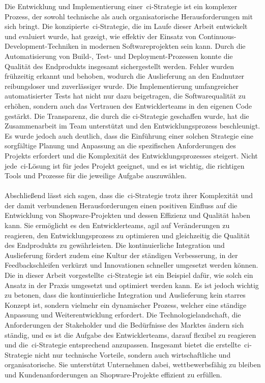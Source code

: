 Die Entwicklung und Implementierung einer\ \acrshort{ci}-Strategie ist ein komplexer Prozess, der sowohl technische als
auch organisatorische Herausforderungen mit sich bringt.
Die konzipierte\ \acrshort{ci}-Strategie, die im Laufe dieser Arbeit entwickelt und evaluiert wurde, hat gezeigt, wie
effektiv der Einsatz von Continuous-Development-Techniken in modernen Softwareprojekten sein kann.
Durch die Automatisierung von Build-, Test- und Deployment-Prozessen konnte die Qualität des Endprodukts insgesamt
sichergestellt werden.
Fehler wurden frühzeitig erkannt und behoben, wodurch die Auslieferung an den Endnutzer reibungsloser und zuverlässiger
wurde.
Die Implementierung umfangreicher automatisierter Tests hat nicht nur dazu beigetragen, die Softwarequalität zu erhöhen,
sondern auch das Vertrauen des Entwicklerteams in den eigenen Code gestärkt.
Die Transparenz, die durch die \acrshort{ci}-Strategie geschaffen wurde, hat die Zusammenarbeit im Team unterstützt und
den Entwicklungsprozess beschleunigt.
Es wurde jedoch auch deutlich, dass die Einführung einer solchen Strategie eine sorgfältige Planung und Anpassung an die
spezifischen Anforderungen des Projekts erfordert und die Komplexität des Entwicklungsprozesses steigert.
Nicht jede\ \acrshort{ci}-Lösung ist für jedes Projekt geeignet, und es ist wichtig, die richtigen Tools und Prozesse
für die jeweilige Aufgabe auszuwählen.
\\\\
Abschließend lässt sich sagen, dass die\ \acrshort{ci}-Strategie trotz ihrer Komplexität und der damit verbundenen
Herausforderungen einen positiven Einfluss auf die Entwicklung von Shopware-Projekten und dessen Effizienz und Qualität
haben kann.
Sie ermöglicht es den Entwicklerteams, agil auf Veränderungen zu reagieren, den Entwicklungsprozess zu optimieren
und gleichzeitig die Qualität des Endprodukts zu gewährleisten.
Die kontinuierliche Integration und Auslieferung fördert zudem eine Kultur der ständigen Verbesserung, in der
Feedbackschleifen verkürzt und Innovationen schneller umgesetzt werden können.
Die in dieser Arbeit vorgestellte\ \acrshort{ci}-Strategie ist ein Beispiel dafür, wie solch ein Ansatz in der Praxis
umgesetzt und optimiert werden kann.
Es ist jedoch wichtig zu betonen, dass die kontinuierliche Integration und Auslieferung kein starres Konzept ist,
sondern vielmehr ein dynamischer Prozess, welcher eine ständige Anpassung und Weiterentwicklung erfordert.
Die Technologielandschaft, die Anforderungen der Stakeholder und die Bedürfnisse des Marktes ändern sich ständig, und
es ist die Aufgabe des Entwicklerteams, darauf flexibel zu reagieren und die\ \acrshort{ci}-Strategie entsprechend
anzupassen.
Insgesamt bietet die erstellte\ \acrshort{ci}-Strategie nicht nur technische Vorteile, sondern auch wirtschaftliche und
organisatorische.
Sie unterstützt Unternehmen dabei, wettbewerbsfähig zu bleiben und Kundenanforderungen an Shopware-Projekte effizient
zu erfüllen.

